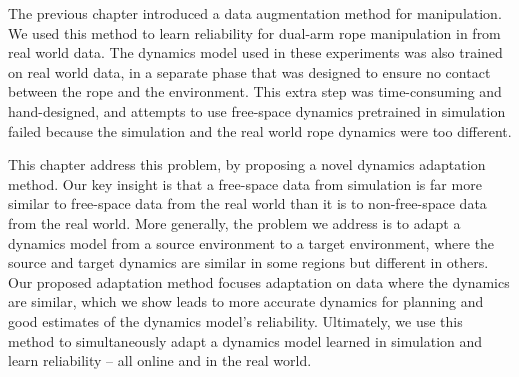 The previous chapter introduced a data augmentation method for manipulation. We used this method to learn reliability for dual-arm rope manipulation in from real world data. The dynamics model used in these experiments was also trained on real world data, in a separate phase that was designed to ensure no contact between the rope and the environment. This extra step was time-consuming and hand-designed, and attempts to use free-space dynamics pretrained in simulation failed because the simulation and the real world rope dynamics were too different.

This chapter address this problem, by proposing a novel dynamics adaptation method. Our key insight is that a free-space data from simulation is far more similar to free-space data from the real world than it is to non-free-space data from the real world. More generally, the problem we address is to adapt a dynamics model from a source environment to a target environment, where the source and target dynamics are similar in some regions but different in others. Our proposed adaptation method focuses adaptation on data where the dynamics are similar, which we show leads to more accurate dynamics for planning and good estimates of the dynamics model's reliability. Ultimately, we use this method to simultaneously adapt a dynamics model learned in simulation and learn reliability -- all online and in the real world.






